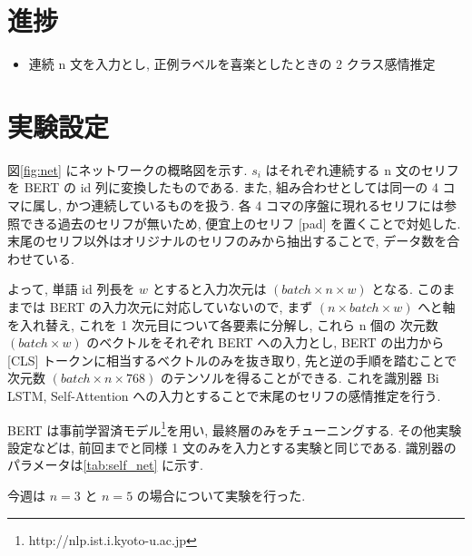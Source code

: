 \documentclass[twocolumn]{jarticle}     %
\begin{document}

\section{進捗}

\begin{itemize}
  \item 連続 n 文を入力とし, 正例ラベルを喜楽としたときの 2 クラス感情推定
\end{itemize}

\section{実験設定}
図\ref{fig:net} にネットワークの概略図を示す. ${s_i}$ はそれぞれ連続する n 文のセリフを BERT の id 列に変換したものである. また, 組み合わせとしては同一の 4 コマに属し, かつ連続しているものを扱う. 各 4 コマの序盤に現れるセリフには参照できる過去のセリフが無いため, 便宜上のセリフ $[$pad$]$ を置くことで対処した. 末尾のセリフ以外はオリジナルのセリフのみから抽出することで, データ数を合わせている.

よって, 単語 id 列長を $w$ とすると入力次元は $(batch \times n \times w)$ となる. このままでは BERT の入力次元に対応していないので, まず $(n \times batch \times w)$ へと軸を入れ替え, これを 1 次元目について各要素に分解し, これら n 個の 次元数 $(batch \times w)$ のベクトルをそれぞれ BERT への入力とし, BERT の出力から [CLS] トークンに相当するベクトルのみを抜き取り, 先と逆の手順を踏むことで次元数 $(batch \times n \times 768)$ のテンソルを得ることができる. これを識別器 Bi LSTM, Self-Attention への入力とすることで末尾のセリフの感情推定を行う.

BERT は事前学習済モデル\footnote{http://nlp.ist.i.kyoto-u.ac.jp}を用い, 最終層のみをチューニングする. その他実験設定などは, 前回までと同様 1 文のみを入力とする実験と同じである. 識別器のパラメータは\ref{tab:self_net} に示す.

今週は $n = 3$ と $n = 5$ の場合について実験を行った.
\end{document}
